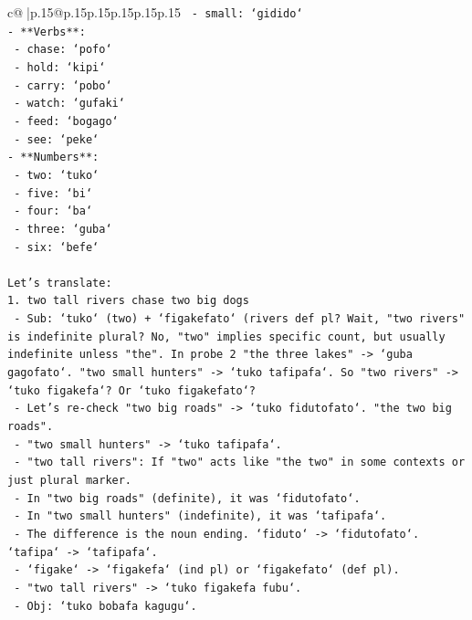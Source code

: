 \documentclass{article}
\begin{document}
{\begin{supertabular}{c@{$\;$}|p{.15\linewidth}@{}p{.15\linewidth}p{.15\linewidth}p{.15\linewidth}p{.15\linewidth}p{.15\linewidth}}
{{{\texttt{  {-} small: `gidido`} \\
\texttt{{-} **Verbs**:} \\
\texttt{  {-} chase: `pofo`} \\
\texttt{  {-} hold: `kipi`} \\
\texttt{  {-} carry: `pobo`} \\
\texttt{  {-} watch: `gufaki`} \\
\texttt{  {-} feed: `bogago`} \\
\texttt{  {-} see: `peke`} \\
\texttt{{-} **Numbers**:} \\
\texttt{  {-} two: `tuko`} \\
\texttt{  {-} five: `bi`} \\
\texttt{  {-} four: `ba`} \\
\texttt{  {-} three: `guba`} \\
\texttt{  {-} six: `befe`} \\
\\ 
\texttt{Let's translate:} \\
\texttt{1. two tall rivers chase two big dogs} \\
\texttt{   {-} Sub: `tuko` (two) + `figakefato` (rivers def pl? Wait, "two rivers" is indefinite plural? No, "two" implies specific count, but usually indefinite unless "the". In probe 2 "the three lakes" {-}> `guba gagofato`. "two small hunters" {-}> `tuko tafipafa`. So "two rivers" {-}> `tuko figakefa`? Or `tuko figakefato`?} \\
\texttt{   {-} Let's re{-}check "two big roads" {-}> `tuko fidutofato`. "the two big roads".} \\
\texttt{   {-} "two small hunters" {-}> `tuko tafipafa`.} \\
\texttt{   {-} "two tall rivers": If "two" acts like "the two" in some contexts or just plural marker.} \\
\texttt{   {-} In "two big roads" (definite), it was `fidutofato`.} \\
\texttt{   {-} In "two small hunters" (indefinite), it was `tafipafa`.} \\
\texttt{   {-} The difference is the noun ending. `fiduto` {-}> `fidutofato`. `tafipa` {-}> `tafipafa`.} \\
\texttt{   {-} `figake` {-}> `figakefa` (ind pl) or `figakefato` (def pl).} \\
\texttt{   {-} "two tall rivers" {-}> `tuko figakefa fubu`.} \\
\texttt{   {-} Obj: `tuko bobafa kagugu`.} \\
}}}
\end{supertabular}}
\end{document}
